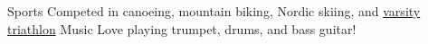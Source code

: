 
\begin{cvskills}
  \cvskill
    {Sports} %
    {Competed in canoeing, mountain biking, Nordic skiing, and \href{https://gogaelsgo.com/sports/triathlon/roster}{varsity triathlon}}
  \cvskill
    {Music} %
    {Love playing trumpet, drums, and bass guitar!}
\end{cvskills}